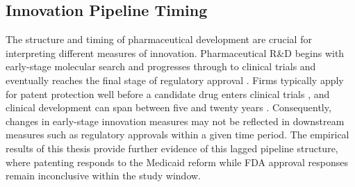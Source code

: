 \documentclass[12pt]{article}
\begin{document}
\subsection{Innovation Pipeline Timing}

The structure and timing of pharmaceutical development are crucial for interpreting different measures of innovation. Pharmaceutical R\&D begins with early-stage molecular search and progresses through to clinical trials and eventually reaches the final stage of regulatory approval \citep{sutton1998technology}. Firms typically apply for patent protection well before a candidate drug enters clinical trials \citep{budish2015firms}, and clinical development can span between five and twenty years \citep{brown2022clinical}. Consequently, changes in early-stage innovation measures may not be reflected in downstream measures such as regulatory approvals within a given time period. The empirical results of this thesis provide further evidence of this lagged pipeline structure, where patenting responds to the Medicaid reform while FDA approval responses remain inconclusive within the study window.

\clearpage



\end{document}
